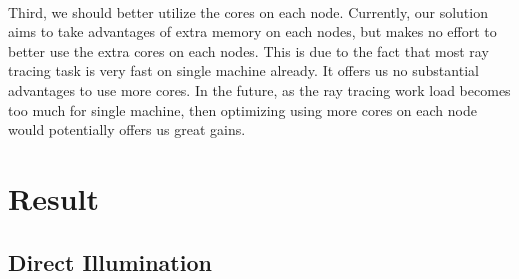 \documentclass[a4paper, oneside, 10pt]{article}
\begin{document}
\paragraph{} Third, we should better utilize the cores on each node. Currently, our solution aims to take advantages of extra memory on each nodes, but makes no effort to better use the extra cores on each nodes. This is due to the fact that most ray tracing task is very fast on single machine already. It offers us no substantial advantages to use more cores.  In the future, as the ray tracing work load becomes too much for single machine, then optimizing using more cores on each node would potentially offers us great gains.

\section{Result}
\subsection{Direct Illumination}
\end{document}
